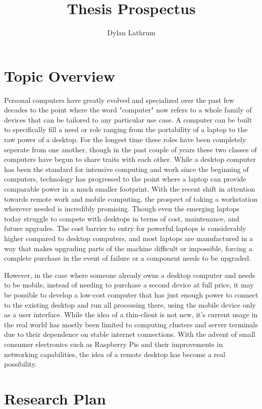 \documentclass[11pt]{article}
\title{Thesis Prospectus}
\author{Dylan Lathrum}
\date{} %
\begin{document}
\maketitle

\section*{Topic Overview}

Personal computers have greatly evolved and specialized over the past few decades to the point where the word "computer" now refers to a whole family of devices that can be tailored to any particular use case.
A computer can be built to specifically fill a need or role ranging from the portability of a laptop to the raw power of a desktop.
For the longest time these roles have been completely seperate from one another, though in the past couple of years these two classes of computers have begun to share traits with each other.
While a desktop computer has been the standard for intensive computing and work since the beginning of computers, technology has progressed to the point where a laptop can provide comparable power in a much smaller footprint.
With the recent shift in attention towards remote work and mobile computing, the prospect of taking a workstation wherever needed is incredibly promising.
Though even the emerging laptops today struggle to compete with desktops in terms of cost, maintenance, and future upgrades.
The cost barrier to entry for powerful laptops is considerably higher compared to desktop computers, and most laptops are manufactured in a way that makes upgrading parts of the machine difficult or impossible, forcing a complete purchase in the event of failure or a component needs to be upgraded.

However, in the case where someone already owns a desktop computer and needs to be mobile, instead of needing to purchase a second device at full price, it may be possible to develop a low-cost computer that has just enough power to connect to the existing desktop and run all processing there, using the mobile device only as a user interface.
While the idea of a thin-client is not new, it's current usage in the real world has mostly been limited to computing clusters and server terminals due to their dependence on stable internet connections.
With the advent of small consumer electronics such as Raspberry Pis and their improvements in networking capabilities, the idea of a remote desktop has become a real possibility.

\section*{Research Plan}
\end{document}

